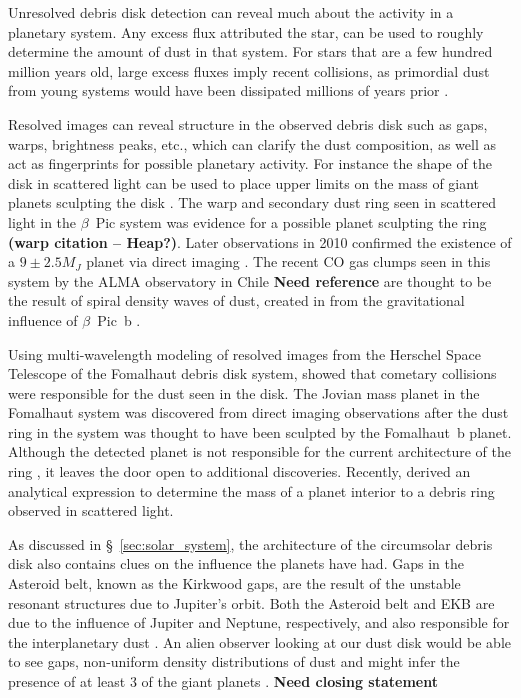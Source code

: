     Unresolved debris disk detection can reveal much about the activity in a planetary system. Any excess flux attributed the star, can be used to roughly determine the amount of dust in that system. For stars that are a few hundred million years old, large excess fluxes imply recent collisions, as primordial dust from young systems would have been dissipated millions of years prior \citep[e.g., BD+20 307,][]{Song2005}.  

    Resolved images can reveal structure in the observed debris disk such as gaps, warps, brightness peaks, etc., which can clarify the dust composition, as well as act as fingerprints for possible planetary activity. For instance the shape of the disk in scattered light can be used to place upper limits on the mass of giant planets sculpting the disk \citet{Rodigas2014}. The warp and secondary dust ring seen in scattered light in the $\beta$~Pic system was evidence for a possible planet sculpting the ring \textbf{(warp citation -- Heap?)}. Later observations in 2010 confirmed the existence of a $9\pm2.5 M_J$ planet via direct imaging \citep{Lagrange2010, Marleau2014}. The recent CO gas clumps seen in this system by the ALMA observatory in Chile \textbf{Need reference} are thought to be the result of spiral density waves of dust, created in from the gravitational influence of $\beta$~Pic~b \citep{Nesvold2015}. 
    
    Using multi-wavelength modeling of resolved images from the Herschel Space Telescope of the Fomalhaut debris disk system, \citet{Acke2012} showed that cometary collisions were responsible for the dust seen in the disk. The Jovian mass planet in the Fomalhaut system \citep{Kalas2008} was discovered from direct imaging observations after the dust ring in the system was thought to have been sculpted by the Fomalhaut~b planet. Although the detected planet is not responsible for the current architecture of the ring \citep{Kalas2013}, it leaves the door open to additional discoveries. Recently, \citet{Rodigas2014} derived an analytical expression to determine the mass of a planet interior to a debris ring observed in scattered light. 
    
    As discussed in \S~\ref{sec:solar_system}, the architecture of the circumsolar debris disk also contains clues on the influence the planets have had. Gaps in the Asteroid belt, known as the Kirkwood gaps, are the result of the unstable resonant structures due to Jupiter's orbit. Both the Asteroid belt and EKB are due to the influence of Jupiter and Neptune, respectively, and also responsible for the interplanetary dust \citep[e.g.,][]{Morbidelli2010}. An alien observer looking at our dust disk would be able to see gaps, non-uniform density distributions of dust and might infer the presence of at least 3 of the giant planets \citep{Liou1999}. \textbf{Need closing statement}


